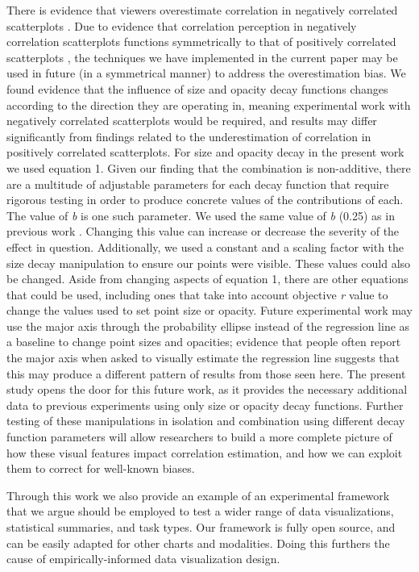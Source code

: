 \documentclass[manuscript, review, anonymous, screen]{acmart}
\begin{document}
There is evidence that viewers overestimate correlation in negatively
correlated scatterplots \citep{sher_2017}. Due to evidence that
correlation perception in negatively correlation scatterplots functions
symmetrically to that of positively correlated scatterplots
\citep{harrison_2014}, the techniques we have implemented in the current
paper may be used in future (in a symmetrical manner) to address the
overestimation bias. We found evidence that the influence of size and
opacity decay functions changes according to the direction they are
operating in, meaning experimental work with negatively correlated
scatterplots would be required, and results may differ significantly
from findings related to the underestimation of correlation in
positively correlated scatterplots. For size and opacity decay in the
present work we used equation 1. Given our finding that the combination
is non-additive, there are a multitude of adjustable parameters for each
decay function that require rigorous testing in order to produce
concrete values of the contributions of each. The value of \emph{b} is
one such parameter. We used the same value of \emph{b} (0.25) as in
previous work \citep{strain_2023, strain_2023b}. Changing this value can
increase or decrease the severity of the effect in question.
Additionally, we used a constant and a scaling factor with the size
decay manipulation to ensure our points were visible. These values could
also be changed. Aside from changing aspects of equation 1, there are
other equations that could be used, including ones that take into
account objective \emph{r} value to change the values used to set point
size or opacity. Future experimental work may use the major axis through
the probability ellipse instead of the regression line as a baseline to
change point sizes and opacities; evidence that people often report the
major axis when asked to visually estimate the regression line
\citep{collyer_1990} suggests that this may produce a different pattern
of results from those seen here. The present study opens the door for
this future work, as it provides the necessary additional data to
previous experiments using only size \citep{strain_2023b} or opacity
\citep{strain_2023} decay functions. Further testing of these
manipulations in isolation and combination using different decay
function parameters will allow researchers to build a more complete
picture of how these visual features impact correlation estimation, and
how we can exploit them to correct for well-known biases.

Through this work we also provide an example of an experimental
framework that we argue should be employed to test a wider range of data
visualizations, statistical summaries, and task types. Our framework is
fully open source, and can be easily adapted for other charts and
modalities. Doing this furthers the cause of empirically-informed data
visualization design.




\end{document}

